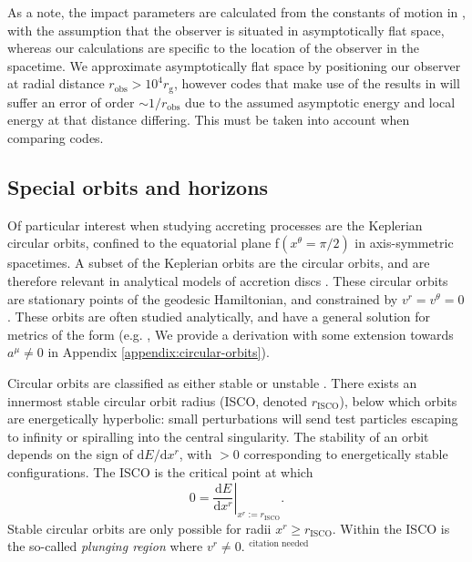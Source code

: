 \documentclass[fleqn,usenatbib]{mnras}
\newcommand{\citneeded}{{\bf \color{red} $^{\text{citation needed}}$}}
\renewcommand{\d}{\text{d}}
\newcommand{\rg}{r_\text{g}}
\newcommand{\risco}{r_\text{ISCO}}
\begin{document}
As a note, the impact parameters are calculated from the constants of motion in
\cite{cunningham_optical_1973}, with the assumption that the observer is
situated in asymptotically flat space, whereas our calculations are specific to
the location of the observer in the spacetime. We approximate asymptotically
flat space by positioning our observer at radial distance $r_\text{obs} > 10^4
\rg$, however codes that make use of the results in
\cite{cunningham_optical_1973} will suffer an error of order
$\sim1/r_\text{obs}$ due to the assumed asymptotic energy and local energy at
that distance differing. This must be taken into account when comparing codes.

\subsection{Special orbits and horizons}
\label{sec:special-orbits}

Of particular interest when studying accreting processes are the Keplerian
circular orbits, confined to the equatorial plane f$(x^\theta = \pi/2)$ in
axis-symmetric spacetimes. A subset of the Keplerian orbits are the circular
orbits, and are therefore relevant in analytical models of accretion discs
\citep{shakura_black_1973}. These circular orbits are stationary points of the
geodesic Hamiltonian, and constrained by $v^r = v^\theta = 0$.  These orbits are
often studied analytically, and have a general solution for metrics of the form
\citep{eq:static_axisymmetric_metric} (e.g. \citealp{johannsen_regular_2013},
We provide a derivation with some extension towards $a^\mu \neq 0$ in Appendix
\ref{appendix:circular-orbits}).

Circular orbits are classified as either stable or unstable
\citep{wilkins_bound_1972,bardeen_rotating_1972}. There exists an innermost
stable circular orbit radius (ISCO, denoted $\risco$), below which orbits
are energetically hyperbolic: small perturbations will send test particles
escaping to infinity or spiralling into the central singularity. The stability of
an orbit depends on the sign of $\d E / \d x^r$, with $>0$ corresponding to
energetically stable configurations. The ISCO is the critical point at
which 
\begin{equation}
    \label{eq:isco-definition}
    0 = \left. \frac{\d E}{\d x^r} \right\rvert_{x^r := \risco}.
\end{equation}
Stable circular orbits are only possible for radii $x^r \geq \risco$.
Within the ISCO is the so-called \textit{plunging region} where $v^r \neq 0$.
\citneeded
\end{document}
